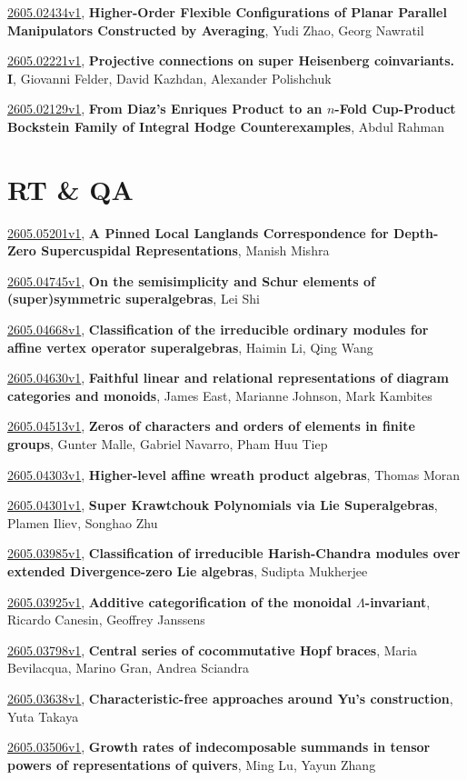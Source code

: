 \documentclass[9pt, a4paper]{article}
\theoremstyle{plain}
\theoremstyle{definition}
\theoremstyle{remark}
\newcommand{\arxiv}[3]{\href{https://arxiv.org/abs/#1}{#1}, \textbf{\textcolor{arxivblue}{#2}}, #3}
\begin{document}
\arxiv{2605.02434v1}{Higher-Order Flexible Configurations of Planar Parallel Manipulators Constructed by Averaging}{Yudi Zhao, Georg Nawratil}

\arxiv{2605.02221v1}{Projective connections on super Heisenberg coinvariants. I}{Giovanni Felder, David Kazhdan, Alexander Polishchuk}

\arxiv{2605.02129v1}{From Diaz's Enriques Product to an $n$-Fold Cup-Product Bockstein Family of Integral Hodge Counterexamples}{Abdul Rahman}


\section{RT \& QA}
\arxiv{2605.05201v1}{A Pinned Local Langlands Correspondence for Depth-Zero Supercuspidal Representations}{Manish Mishra}

\arxiv{2605.04745v1}{On the semisimplicity and Schur elements of (super)symmetric superalgebras}{Lei Shi}

\arxiv{2605.04668v1}{Classification of the irreducible ordinary modules for affine vertex operator superalgebras}{Haimin Li, Qing Wang}

\arxiv{2605.04630v1}{Faithful linear and relational representations of diagram categories and monoids}{James East, Marianne Johnson, Mark Kambites}

\arxiv{2605.04513v1}{Zeros of characters and orders of elements in finite groups}{Gunter Malle, Gabriel Navarro, Pham Huu Tiep}

\arxiv{2605.04303v1}{Higher-level affine wreath product algebras}{Thomas Moran}

\arxiv{2605.04301v1}{Super Krawtchouk Polynomials via Lie Superalgebras}{Plamen Iliev, Songhao Zhu}

\arxiv{2605.03985v1}{Classification of irreducible Harish-Chandra modules over extended Divergence-zero Lie algebras}{Sudipta Mukherjee}

\arxiv{2605.03925v1}{Additive categorification of the monoidal $Λ$-invariant}{Ricardo Canesin, Geoffrey Janssens}

\arxiv{2605.03798v1}{Central series of cocommutative Hopf braces}{Maria Bevilacqua, Marino Gran, Andrea Sciandra}

\arxiv{2605.03638v1}{Characteristic-free approaches around Yu's construction}{Yuta Takaya}

\arxiv{2605.03506v1}{Growth rates of indecomposable summands in tensor powers of representations of quivers}{Ming Lu, Yayun Zhang}
\end{document}
